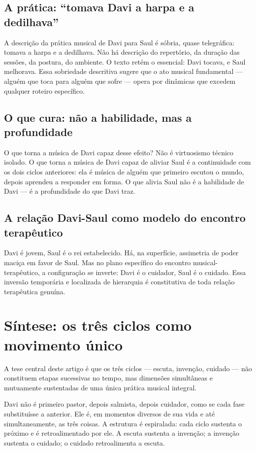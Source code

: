 \documentclass[12pt,a4paper]{article}
\begin{document}
\subsection{A prática: ``tomava Davi a harpa e a dedilhava''}

A descrição da prática musical de Davi para Saul é sóbria, quase telegráfica: tomava a harpa e a dedilhava. Não há descrição do repertório, da duração das sessões, da postura, do ambiente. O texto retém o essencial: Davi tocava, e Saul melhorava. Essa sobriedade descritiva sugere que o ato musical fundamental --- alguém que toca para alguém que sofre --- opera por dinâmicas que excedem qualquer roteiro específico.

\subsection{O que cura: não a habilidade, mas a profundidade}

O que torna a música de Davi capaz desse efeito? Não é virtuosismo técnico isolado. O que torna a música de Davi capaz de aliviar Saul é a continuidade com os dois ciclos anteriores: ela é música de alguém que primeiro escutou o mundo, depois aprendeu a responder em forma. O que alivia Saul não é a habilidade de Davi --- é a profundidade do que Davi traz.

\subsection{A relação Davi-Saul como modelo do encontro terapêutico}

Davi é jovem, Saul é o rei estabelecido. Há, na superfície, assimetria de poder maciça em favor de Saul. Mas no plano específico do encontro musical-terapêutico, a configuração se inverte: Davi é o cuidador, Saul é o cuidado. Essa inversão temporária e localizada de hierarquia é constitutiva de toda relação terapêutica genuína.

\section{Síntese: os três ciclos como movimento único}

A tese central deste artigo é que os três ciclos --- escuta, invenção, cuidado --- não constituem etapas sucessivas no tempo, mas dimensões simultâneas e mutuamente sustentadas de uma única prática musical integral.

Davi não é primeiro pastor, depois salmista, depois cuidador, como se cada fase substituísse a anterior. Ele é, em momentos diversos de sua vida e até simultaneamente, as três coisas. A estrutura é espiralada: cada ciclo sustenta o próximo e é retroalimentado por ele. A escuta sustenta a invenção; a invenção sustenta o cuidado; o cuidado retroalimenta a escuta.
\end{document}
